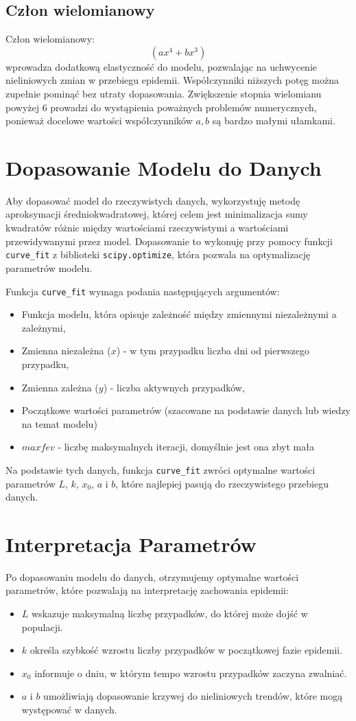 \documentclass{article}
\begin{document}
\subsection{Człon wielomianowy}
Człon wielomianowy:
\[
(ax^4+bx^3)
\]
wprowadza dodatkową elastyczność do modelu, pozwalając na uchwycenie nieliniowych zmian w przebiegu epidemii. Współczynniki niższych potęg można zupełnie pominąć bez utraty dopasowania. Zwiększenie stopnia wielomianu powyżej 6 prowadzi do wystąpienia poważnych problemów numerycznych, ponieważ docelowe wartości współczynników $a,b$ są bardzo małymi ułamkami.

\section{Dopasowanie Modelu do Danych}

Aby dopasować model do rzeczywistych danych, wykorzystuję metodę aproksymacji średniokwadratowej, której celem jest minimalizacja sumy kwadratów różnic między wartościami rzeczywistymi a wartościami przewidywanymi przez model. Dopasowanie to wykonuję przy pomocy funkcji \texttt{curve\_fit} z biblioteki \texttt{scipy.optimize}, która pozwala na optymalizację parametrów modelu.

Funkcja \texttt{curve\_fit} wymaga podania następujących argumentów:
\begin{itemize}
    \item Funkcja modelu, która opisuje zależność między zmiennymi niezależnymi a zależnymi,
    \item Zmienna niezależna ($x$) - w tym przypadku liczba dni od pierwszego przypadku,
    \item Zmienna zależna ($y$) - liczba aktywnych przypadków,
    \item Początkowe wartości parametrów (szacowane na podstawie danych lub wiedzy na temat modelu)
    \item $maxfev$ - liczbę maksymalnych iteracji, domyślnie jest ona zbyt mała
\end{itemize}

Na podstawie tych danych, funkcja \texttt{curve\_fit} zwróci optymalne wartości parametrów $L$, $k$, $x_0$, $a$ i $b$, które najlepiej pasują do rzeczywistego przebiegu danych.

\section{Interpretacja Parametrów}
Po dopasowaniu modelu do danych, otrzymujemy optymalne wartości parametrów, które pozwalają na interpretację zachowania epidemii:
\begin{itemize}
    \item $L$ wskazuje maksymalną liczbę przypadków, do której może dojść w populacji.
    \item $k$ określa szybkość wzrostu liczby przypadków w początkowej fazie epidemii.
    \item $x_0$ informuje o dniu, w którym tempo wzrostu przypadków zaczyna zwalniać.
    \item $a$ i $b$ umożliwiają dopasowanie krzywej do nieliniowych trendów, które mogą występować w danych.
\end{itemize}
\end{document}
